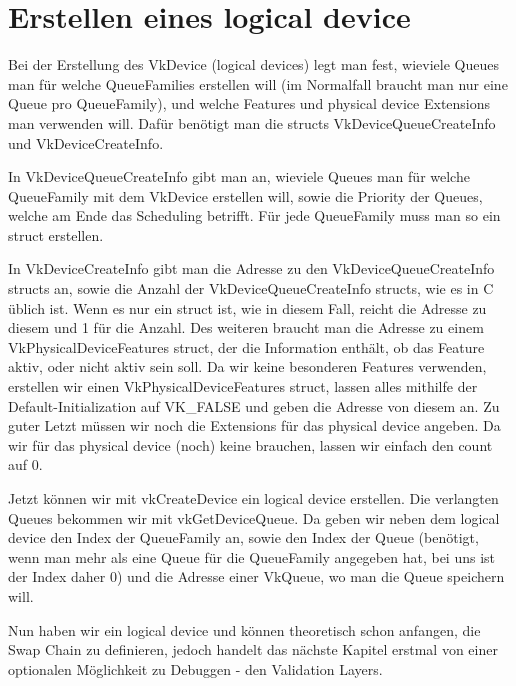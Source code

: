 \documentclass[11pt,a4paper]{report}
\begin{document}
\section{Erstellen eines logical device}
Bei der Erstellung des VkDevice (logical devices) legt man fest, wieviele Queues man für welche QueueFamilies erstellen will (im Normalfall braucht man nur eine Queue pro QueueFamily), und welche Features und physical device Extensions man verwenden will. Dafür benötigt man die structs VkDeviceQueueCreateInfo und VkDeviceCreateInfo.

In VkDeviceQueueCreateInfo gibt man an, wieviele Queues man für welche QueueFamily mit dem VkDevice erstellen will, sowie die Priority der Queues, welche am Ende das Scheduling betrifft. Für jede QueueFamily muss man so ein struct erstellen.

In VkDeviceCreateInfo gibt man die Adresse zu den VkDeviceQueueCreateInfo structs an, sowie die Anzahl der VkDeviceQueueCreateInfo structs, wie es in C üblich ist. Wenn es nur ein struct ist, wie in diesem Fall, reicht die Adresse zu diesem und 1 für die Anzahl. Des weiteren braucht man die Adresse zu einem VkPhysicalDeviceFeatures struct, der die Information enthält, ob das Feature aktiv, oder nicht aktiv sein soll. Da wir keine besonderen Features verwenden, erstellen wir einen VkPhysicalDeviceFeatures struct, lassen alles mithilfe der Default-Initialization auf VK\_FALSE und geben die Adresse von diesem an. Zu guter Letzt müssen wir noch die Extensions für das physical device angeben. Da wir für das physical device (noch) keine brauchen, lassen wir einfach den count auf 0.

Jetzt können wir mit vkCreateDevice ein logical device erstellen. Die verlangten Queues bekommen wir mit vkGetDeviceQueue. Da geben wir neben dem logical device den Index der QueueFamily an, sowie den Index der Queue (benötigt, wenn man mehr als eine Queue für die QueueFamily angegeben hat, bei uns ist der Index daher 0) und die Adresse einer VkQueue, wo man die Queue speichern will.

Nun haben wir ein logical device und können theoretisch schon anfangen, die Swap Chain zu definieren, jedoch handelt das nächste Kapitel erstmal von einer optionalen Möglichkeit zu Debuggen - den Validation Layers.
\end{document}
